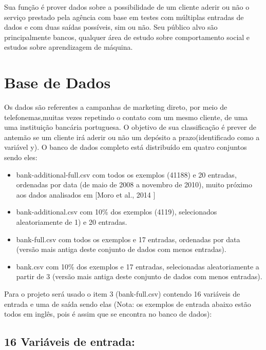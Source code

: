\documentclass[conference]{IEEEtran}
\begin{document}
Sua função é prover dados sobre a possibilidade de um cliente aderir ou não o serviço prestado pela agência com base em testes com múltiplas entradas de dados e com duas saídas possíveis, sim ou não. Seu público alvo são principalmente bancos, qualquer área de estudo sobre comportamento social e estudos sobre aprendizagem de máquina.

\section{Base de Dados}
Os dados são referentes a campanhas de marketing direto, por meio de telefonemas,muitas vezes repetindo o contato com um mesmo cliente, de uma uma instituição bancária portuguesa. O objetivo de sua classificação é prever de antemão se um cliente irá aderir ou não um depósito a prazo(identificado como a variável y).
O banco de dados completo está distribuído em quatro conjuntos sendo eles:

\begin{itemize}
\item bank-additional-full.csv com todos os exemplos (41188) e 20 entradas, ordenadas por data (de maio de 2008 a novembro de 2010), muito próximo aos dados analisados em [Moro et al., 2014 ]

\item bank-additional.csv com 10\% dos exemplos (4119), selecionados aleatoriamente de 1) e 20 entradas.

\item bank-full.csv com todos os exemplos e 17 entradas, ordenadas por data (versão mais antiga deste conjunto de dados com menos entradas).

\item bank.csv com 10\% dos exemplos e 17 entradas, selecionadas aleatoriamente a partir de 3 (versão mais antiga deste conjunto de dados com menos entradas).
\end{itemize}

Para o projeto será usado o item 3 (bank-full.csv) contendo 16 variáveis de entrada e uma de saída sendo elas (Nota: os exemplos de entrada abaixo estão todos em inglês, pois é assim que se encontra no banco de dados):


\subsection{16 Variáveis de entrada:}
\end{document}
